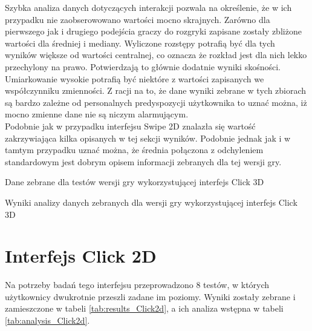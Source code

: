 \documentclass[a4paper,12pt,numbers=noenddot]{report}
\begin{document}
Szybka analiza danych dotyczących interakcji pozwala na określenie, że w ich przypadku nie zaobserowowano wartości mocno skrajnych. Zarówno dla pierwszego jak i drugiego podejścia graczy do rozgryki zapisane zostały zbliżone wartości dla średniej i mediany. Wyliczone rozstępy potrafią być dla tych wyników większe od wartości centralnej, co oznacza że rozkład jest dla nich lekko przechylony na prawo. Potwierdzają to głównie dodatnie wyniki skośności. Umiarkowanie wysokie potrafią być niektóre z wartości zapisanych we współczynniku zmienności. Z racji na to, że dane wyniki zebrane w tych zbiorach są bardzo zależne od personalnych predyspozycji użytkownika to uznać można, iż mocno zmienne dane nie są niczym alarmującym.\\

Podobnie jak w przypadku interfejsu Swipe 2D znalazła się wartość zakrzywiająca kilka opisanych w tej sekcji wyników. Podobnie jednak jak i w tamtym przypadku uznać można, że średnia połączona z odchyleniem standardowym jest dobrym opisem informacji zebranych dla tej wersji gry. 

\begin{table}
  \caption{Dane zebrane dla testów wersji gry wykorzystującej interfejs Click 3D}
  \resizebox{0.9\textwidth}{!}{%
	
  }
  \label{tab:results_Click3d}%
  \caption{Wyniki analizy danych zebranych dla wersji gry wykorzystującej interfejs Click 3D}
  \resizebox{0.9\textwidth}{!}{%
	
  }
  \label{tab:analysis_Click3d}%
\end{table}%


\section{Interfejs Click 2D}%
Na potrzeby badań tego interfejsu przeprowadzono 8 testów, w których użytkownicy dwukrotnie przeszli zadane im poziomy. Wyniki zostały zebrane i zamieszczone w tabeli \ref{tab:results_Click2d}, a ich analiza wstępna w tabeli \ref{tab:analysis_Click2d}.
\end{document}
